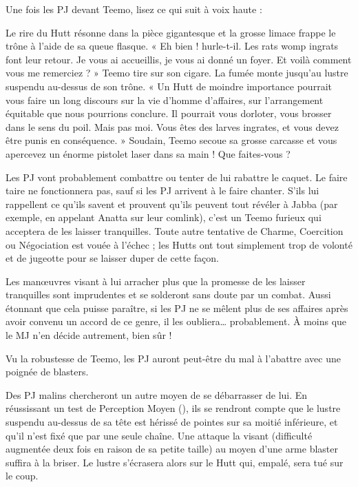 \documentclass[a4paper,10pt,twoside,twocolumn,openany]{book}
\begin{document}
Une fois les PJ devant Teemo, lisez ce qui suit à voix
haute :

\begin{quotebox}
Le rire du Hutt résonne dans la pièce gigantesque
et la grosse limace frappe le trône à l’aide de sa
queue flasque. « Eh bien ! hurle-t-il. Les rats womp
ingrats font leur retour. Je vous ai accueillis, je vous
ai donné un foyer. Et voilà comment vous me remerciez ? » Teemo tire sur son cigare. La fumée
monte jusqu’au lustre suspendu au-dessus de son
trône. « Un Hutt de moindre importance pourrait
vous faire un long discours sur la vie d’homme d’affaires, sur l’arrangement équitable que nous pourrions conclure. Il pourrait vous dorloter, vous brosser dans le sens du poil. Mais pas moi. Vous êtes
des larves ingrates, et vous devez être punis en
conséquence. » Soudain, Teemo secoue sa grosse
carcasse et vous apercevez un énorme pistolet laser dans sa main ! Que faites-vous ?
\end{quotebox}


Les PJ vont probablement combattre ou tenter de lui
rabattre le caquet. Le faire taire ne fonctionnera pas,
sauf si les PJ arrivent à le faire chanter. S’ils lui rappellent ce qu’ils savent et prouvent qu’ils peuvent tout
révéler à Jabba (par exemple, en appelant Anatta sur
leur comlink), c’est un Teemo furieux qui acceptera de
les laisser tranquilles. Toute autre tentative de Charme,
Coercition ou Négociation est vouée à l’échec ; les Hutts
ont tout simplement trop de volonté et de jugeotte pour
se laisser duper de cette façon.

Les manœuvres visant à lui arracher plus que la promesse de les laisser tranquilles sont imprudentes et se
solderont sans doute par un combat. Aussi étonnant que
cela puisse paraître, si les PJ ne se mêlent plus de ses
affaires après avoir convenu un accord de ce genre, il les
oubliera… probablement. À moins que le MJ n’en décide
autrement, bien sûr !

Vu la robustesse de Teemo, les PJ auront peut-être du
mal à l’abattre avec une poignée de blasters.

Des PJ malins chercheront un autre moyen de se débarrasser de lui. En réussissant un test de Perception
Moyen (\difficulty \difficulty), ils se rendront compte que le lustre suspendu au-dessus de sa tête est hérissé de pointes sur
sa moitié inférieure, et qu’il n’est fixé que par une seule
chaîne. Une attaque la visant (difficulté augmentée deux
fois en raison de sa petite taille) au moyen d’une arme
blaster suffira à la briser. Le lustre s’écrasera alors sur le
Hutt qui, empalé, sera tué sur le coup.
\end{document}
